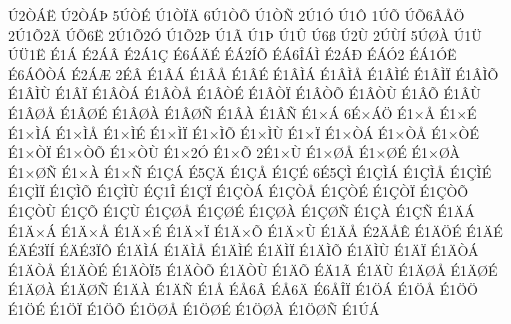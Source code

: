 {^^da2^^d2^^c1^^cb
^^da2^^d2^^c1^^de
5^^da^^d2^^c9
^^da1^^d2^^cf^^c4
6^^da1^^d2^^d5
^^da1^^d2^^d1
2^^da1^^d3
^^da1^^d4
1^^da^^d5
^^da^^d56^^c2^^c5^^d6
2^^da1^^d52^^c4
^^da^^d56^^cb
2^^da1^^d52^^d3
^^da1^^d52^^de
^^da1^^c3
^^da1^^de
^^da1^^db
^^da6^^df
^^da2^^d9
2^^da^^d9^^cd
5^^da^^d8^^c0
^^da1^^dc
^^da^^dc1^^cb
^^c91^^c1
^^c92^^c1^^c2
^^c92^^c11^^c7
^^c96^^c1^^c4^^c9
^^c9^^c12^^cd^^d5
^^c9^^c16^^ce^^c1^^cc
^^c92^^c1^^d0
^^c9^^c1^^d32
^^c9^^c11^^d3^^cb
^^c96^^c1^^d4^^d2^^c1
^^c92^^c1^^c6
2^^c9^^c2
^^c91^^c2^^c1
^^c91^^c2^^c5
^^c91^^c2^^c9
^^c91^^c2^^cc^^c1
^^c91^^c2^^cc^^c5
^^c91^^c2^^cc^^c9
^^c91^^c2^^cc^^cf
^^c91^^c2^^cc^^d5
^^c91^^c2^^cc^^d9
^^c91^^c2^^cf
^^c91^^c2^^d2^^c1
^^c91^^c2^^d2^^c5
^^c91^^c2^^d2^^c9
^^c91^^c2^^d2^^cf
^^c91^^c2^^d2^^d5
^^c91^^c2^^d2^^d9
^^c91^^c2^^d5
^^c91^^c2^^d9
^^c91^^c2^^d8^^c5
^^c91^^c2^^d8^^c9
^^c91^^c2^^d8^^c0
^^c91^^c2^^d8^^d1
^^c91^^c2^^c0
^^c91^^c2^^d1
^^c91^^d7^^c1
6^^c9^^d7^^c1^^d6
^^c91^^d7^^c5
^^c91^^d7^^c9
^^c91^^d7^^cc^^c1
^^c91^^d7^^cc^^c5
^^c91^^d7^^cc^^c9
^^c91^^d7^^cc^^cf
^^c91^^d7^^cc^^d5
^^c91^^d7^^cc^^d9
^^c91^^d7^^cf
^^c91^^d7^^d2^^c1
^^c91^^d7^^d2^^c5
^^c91^^d7^^d2^^c9
^^c91^^d7^^d2^^cf
^^c91^^d7^^d2^^d5
^^c91^^d7^^d2^^d9
^^c91^^d72^^d3
^^c91^^d7^^d5
2^^c91^^d7^^d9
^^c91^^d7^^d8^^c5
^^c91^^d7^^d8^^c9
^^c91^^d7^^d8^^c0
^^c91^^d7^^d8^^d1
^^c91^^d7^^c0
^^c91^^d7^^d1
^^c91^^c7^^c1
^^c95^^c7^^c4
^^c91^^c7^^c5
^^c91^^c7^^c9
6^^c95^^c7^^cc
^^c91^^c7^^cc^^c1
^^c91^^c7^^cc^^c5
^^c91^^c7^^cc^^c9
^^c91^^c7^^cc^^cf
^^c91^^c7^^cc^^d5
^^c91^^c7^^cc^^d9
^^c9^^c71^^ce
^^c91^^c7^^cf
^^c91^^c7^^d2^^c1
^^c91^^c7^^d2^^c5
^^c91^^c7^^d2^^c9
^^c91^^c7^^d2^^cf
^^c91^^c7^^d2^^d5
^^c91^^c7^^d2^^d9
^^c91^^c7^^d5
^^c91^^c7^^d9
^^c91^^c7^^d8^^c5
^^c91^^c7^^d8^^c9
^^c91^^c7^^d8^^c0
^^c91^^c7^^d8^^d1
^^c91^^c7^^c0
^^c91^^c7^^d1
^^c91^^c4^^c1
^^c91^^c4^^d7^^c1
^^c91^^c4^^d7^^c5
^^c91^^c4^^d7^^c9
^^c91^^c4^^d7^^cf
^^c91^^c4^^d7^^d5
^^c91^^c4^^d7^^d9
^^c91^^c4^^c5
^^c92^^c4^^c5^^ca
^^c91^^c4^^d6^^c9
^^c91^^c4^^c9
^^c9^^c4^^c93^^cf^^cd
^^c9^^c4^^c93^^cf^^d4
^^c91^^c4^^cc^^c1
^^c91^^c4^^cc^^c5
^^c91^^c4^^cc^^c9
^^c91^^c4^^cc^^cf
^^c91^^c4^^cc^^d5
^^c91^^c4^^cc^^d9
^^c91^^c4^^cf
^^c91^^c4^^d2^^c1
^^c91^^c4^^d2^^c5
^^c91^^c4^^d2^^c9
^^c91^^c4^^d2^^cf5
^^c91^^c4^^d2^^d5
^^c91^^c4^^d2^^d9
^^c91^^c4^^d5
^^c9^^c41^^c3
^^c91^^c4^^d9
^^c91^^c4^^d8^^c5
^^c91^^c4^^d8^^c9
^^c91^^c4^^d8^^c0
^^c91^^c4^^d8^^d1
^^c91^^c4^^c0
^^c91^^c4^^d1
^^c91^^c5
^^c9^^c56^^c2
^^c9^^c56^^c4
^^c96^^c5^^ce^^cf
^^c91^^d6^^c1
^^c91^^d6^^c5
^^c91^^d6^^d6
^^c91^^d6^^c9
^^c91^^d6^^cf
^^c91^^d6^^d5
^^c91^^d6^^d8^^c5
^^c91^^d6^^d8^^c9
^^c91^^d6^^d8^^c0
^^c91^^d6^^d8^^d1
^^c91^^da^^c1
}
